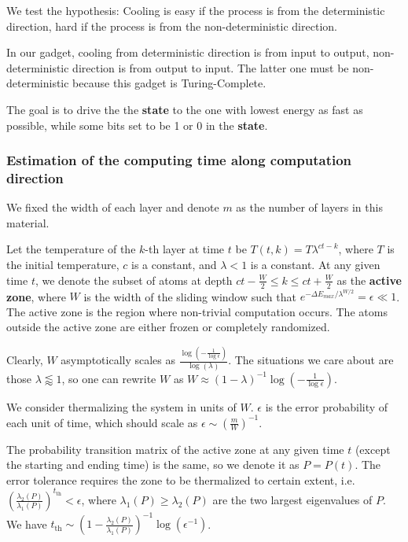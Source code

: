 \documentclass[twocolumn,superscriptaddress,english,showpacs,longbibliography]{revtex4-2}
\begin{document}
We test the hypothesis: Cooling is easy if the process is from the
deterministic direction, hard if the process is from the
non-deterministic direction.

In our gadget, cooling from deterministic direction is from input to
output, non-deterministic direction is from output to input. The latter
one must be non-deterministic because this gadget is Turing-Complete.

The goal is to drive the the \textbf{state} to the one with lowest energy as fast as possible, while some bits set to be 1 or 0 in the \textbf{state}.

\subsubsection{Estimation of the computing time along computation direction}\label{estimation-of-the-computing-time}

We fixed the width of each layer and denote $m$ as the number of layers in this material.

Let the temperature of the $k$-th layer at time $t$ be
$T(t, k) = T \lambda^{ct - k}$, where $T$ is the initial
temperature, $c$ is a constant, and $\lambda < 1$ is a constant. At
any given time $t$, we denote the subset of atoms at depth
$ct-\frac{W}{2}\le k \le ct + \frac{W}{2}$ as the \textbf{active zone},
where $W$ is the width of the sliding window such that
$e^{-\Delta E_{max} /\lambda^{W/2}} = \epsilon \ll 1$. The active zone
is the region where non-trivial computation occurs. The atoms outside
the active zone are either frozen or completely randomized. 

Clearly, $W$ asymptotically scales as $\frac{\log(-\frac{1}{\log{\epsilon}})}{\log(\lambda)}$. The situations we care about
are those $\lambda \lessapprox 1$, so one can rewrite $W$ as $W \approx (1-\lambda)^{-1} \log(-\frac{1}{\log\epsilon})$.

We consider thermalizing the system in units of $W$. $\epsilon$ is
the error probability of each unit of time, which should scale as
$\epsilon \sim\left(\frac{m}{W}\right)^{-1}$.

The probability transition matrix of the active zone at any given time
$t$ (except the starting and ending time) is the same, so we denote it
as $P = P(t)$. The error tolerance requires the zone to be thermalized
to certain extent,
i.e.~$\left(\frac{\lambda_2(P)}{\lambda_1(P)}\right)^{t_{\text{th}}} < \epsilon$,
where $\lambda_1(P) \geq \lambda_2(P)$ are the two largest eigenvalues
of $P$. We have
$t_{\text{th}} \sim \left(1-\frac{\lambda_2(P)}{\lambda_1(P)}\right)^{-1}\log(\epsilon^{-1})$.
\end{document}
